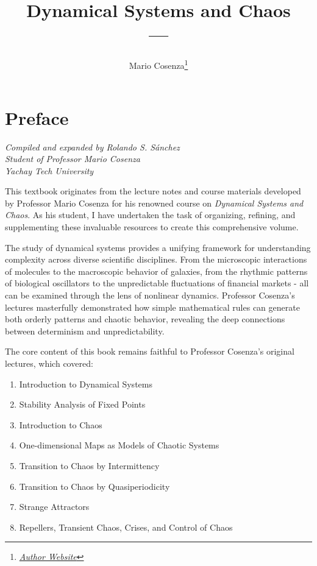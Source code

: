 \documentclass[10pt]{article}
\title{{\Huge Dynamical Systems and Chaos}\\{\Large{---}}}
\author{Mario Cosenza\footnote{\href{https://google.com/}{\textit{Author Website}}}}
\affiliation{Affiliation of Author}
\begin{document}
\maketitle

  \part*{Preface}
  \begin{flushright}
    {\itshape Compiled and expanded by Rolando S. Sánchez\\
    Student of Professor Mario Cosenza\\
    Yachay Tech University}
  \end{flushright}

  This textbook originates from the lecture notes and course materials developed by Professor Mario Cosenza for his renowned course on 
  \textit{Dynamical Systems and Chaos}. As his student, I have undertaken the task of organizing, refining, and supplementing these 
  invaluable resources to create this comprehensive volume.

  The study of dynamical systems provides a unifying framework for understanding complexity across diverse scientific disciplines. 
  From the microscopic interactions of molecules to the macroscopic behavior of galaxies, from the rhythmic patterns of biological 
  oscillators to the unpredictable fluctuations of financial markets - all can be examined through the lens of nonlinear dynamics. 
  Professor Cosenza's lectures masterfully demonstrated how simple mathematical rules can generate both orderly patterns and chaotic 
  behavior, revealing the deep connections between determinism and unpredictability.

  The core content of this book remains faithful to Professor Cosenza's original lectures, which covered:
  \begin{enumerate}
    \item Introduction to Dynamical Systems
    \item Stability Analysis of Fixed Points
    \item Introduction to Chaos
    \item One-dimensional Maps as Models of Chaotic Systems
    \item Transition to Chaos by Intermittency
    \item Transition to Chaos by Quasiperiodicity
    \item Strange Attractors
    \item Repellers, Transient Chaos, Crises, and Control of Chaos
  \end{enumerate}
\end{document}
